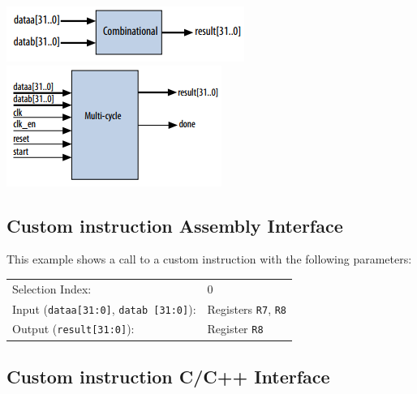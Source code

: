 		\begin{multicols}{2}
			\includegraphics[width=0.8\linewidth]{./pictures/customInstCombinational.png}\\
			\includegraphics[width=0.8\linewidth]{./pictures/customInstMultiCycle.png}\\
		\end{multicols}
		
	\subsection{Custom instruction Assembly Interface}
		This example shows a call to a custom instruction with the following parameters:
	
		\begin{table}[H]\centering
			\begin{tabular}{ll}
				Selection Index: 
					& 0\\
				Input (\texttt{dataa[31:0]}, \texttt{datab [31:0]}): 
					& Registers \texttt{R7}, \texttt{R8}\\
				Output (\texttt{result[31:0]}): 
					& Register \texttt{R8}\\
			\end{tabular}
		\end{table}
		
		

	\subsection{Custom instruction C/C++ Interface}
		